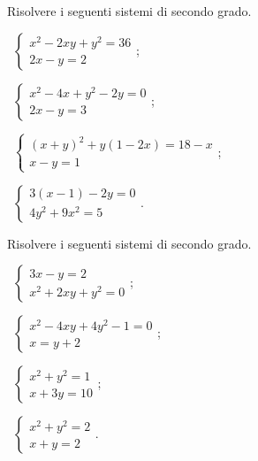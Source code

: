\begin{esercizio}[\Ast]
 \label{ese:6.4}
Risolvere i seguenti sistemi di secondo grado.
\begin{multicols}{2}
 \begin{enumeratea}
 \item~$\left\{\begin{array}{l}x^2-2xy+y^2=36\\2x-y=2\end{array}\right.$;
 \item~$\left\{\begin{array}{l}x^2-4x+y^2-2y=0\\2x-y=3\end{array}\right.$;
 \item~$\left\{\begin{array}{l}(x+y)^2+y(1-2x)=18-x\\x-y=1\end{array}\right.$;
 \item~$\left\{\begin{array}{l}3(x-1)-2y=0\\4y^{2}+9x^{2}=5\end{array}\right.$.
 \end{enumeratea}
 \end{multicols}
\end{esercizio}

\begin{esercizio}[\Ast]
 \label{ese:6.5}
Risolvere i seguenti sistemi di secondo grado.
\begin{multicols}{2}
 \begin{enumeratea}
 \item~$\left\{\begin{array}{l}3x-y=2\\x^2+2xy+y^2=0\end{array}\right.$;
 \item~$\left\{\begin{array}{l}x^2-4xy+4y^2-1=0\\x=y+2\end{array}\right.$;
 \item~$\left\{\begin{array}{l}x^2+y^2=1\\x+3y=10\end{array}\right.$;
 \item~$\left\{\begin{array}{l}x^2+y^2=2\\x+y=2\end{array}\right.$.
 \end{enumeratea}
 \end{multicols}
\end{esercizio}

